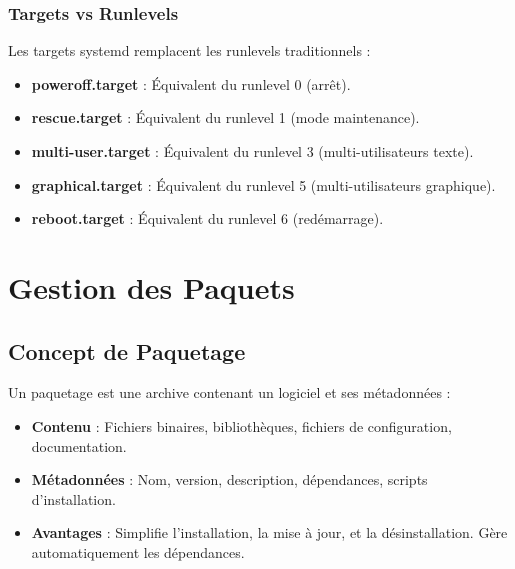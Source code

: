 \documentclass[12pt,a4paper]{article}
\begin{document}
\subsubsection{Targets vs Runlevels}

Les targets systemd remplacent les runlevels traditionnels :

\begin{itemize}
    \item \textbf{poweroff.target} : Équivalent du runlevel 0 (arrêt).
    
    \item \textbf{rescue.target} : Équivalent du runlevel 1 (mode maintenance).
    
    \item \textbf{multi-user.target} : Équivalent du runlevel 3 (multi-utilisateurs texte).
    
    \item \textbf{graphical.target} : Équivalent du runlevel 5 (multi-utilisateurs graphique).
    
    \item \textbf{reboot.target} : Équivalent du runlevel 6 (redémarrage).
\end{itemize}


\section{Gestion des Paquets}

\subsection{Concept de Paquetage}

Un paquetage est une archive contenant un logiciel et ses métadonnées :

\begin{itemize}
    \item \textbf{Contenu} : Fichiers binaires, bibliothèques, fichiers de configuration, documentation.
    
    \item \textbf{Métadonnées} : Nom, version, description, dépendances, scripts d'installation.
    
    \item \textbf{Avantages} : Simplifie l'installation, la mise à jour, et la désinstallation. Gère automatiquement les dépendances.
\end{itemize}
\end{document}
